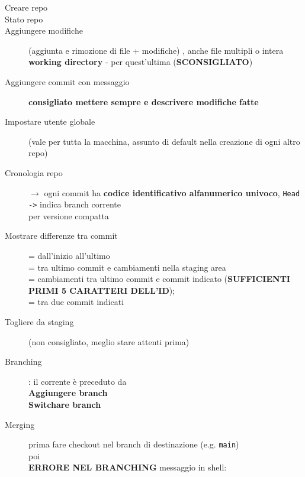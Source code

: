 \documentclass[10pt, oneside]{Book}
\begin{document}
\begin{description}
\item[Creare repo] 
\item[Stato repo] 
\item[Aggiungere modifiche] (aggiunta e rimozione di file + modifiche) , anche file multipli o intera \textbf{working directory} - per quest'ultima  (\textbf{SCONSIGLIATO})
\item[Aggiungere commit con messaggio] \textbf{consigliato mettere sempre e descrivere modifiche fatte}
\item[Impostare utente globale]   (vale per tutta la macchina, assunto di default nella creazione di ogni altro repo)
\item[Cronologia repo]  $\rightarrow$ ogni commit ha \textbf{codice identificativo alfanumerico univoco}, \texttt{Head ->} indica branch corrente
\\ per versione compatta
\item[Mostrare differenze tra commit]  = dall'inizio all'ultimo
\\ = tra ultimo commit e cambiamenti nella staging area
\\ = cambiamenti tra ultimo commit e commit indicato (\textbf{SUFFICIENTI PRIMI 5 CARATTERI DELL'ID}); 
\\ = tra due commit indicati
\item[Togliere da staging]  (non consigliato, meglio stare attenti prima)
\item[Branching]  : il corrente è preceduto da \boxed{\texttt{\*}}
\\\textbf{Aggiungere branch} 
\\\textbf{Switchare branch} 
\item[Merging]  prima fare checkout nel branch di destinazione (e.g. \texttt{main})
\\ poi 
\\\textbf{ERRORE NEL BRANCHING} messaggio in shell:

\end{description}
\end{document}
